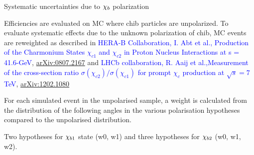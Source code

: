 \begin{frame}{Systematic uncertainties due to $\chi_{b}$ polarization}
\begin{block}{}
\small
Efficiencies are evaluated on MC where chib particles are unpolarized. To evaluate systematic effects due to the unknown polarization of chib, MC events are reweighted as described in \textcolor{blue}{HERA-B Collaboration, I. Abt et al.,  Production of the Charmonium States $\chi_{c1}$ and $\chi_{c2}$ in Proton Nucleus Interactions at s = 41.6-GeV}, \href{http://arxiv.org/abs/0807.2167}{arXiv:0807.2167} and
\textcolor{blue}{LHCb collaboration, R. Aaij et al.,Measurement of the cross-section ratio $\sigma(\chi_{c2})/\sigma(\chi_{c1})$ for prompt $\chi_c$
production at $\sqrt{s}=7$ TeV}, \href{http://arxiv.org/abs/1202.1080}{arXiv:1202.1080}
\end{block}
For each simulated event in the unpolarised sample, a weight is calculated from
the distribution of the following angles in the various polarisation hypotheses compared to the
unpolarised distribution.


\vspace{0.1in}

Two hypotheses for $\chi_{b 1}$ state (w0, w1) and three hypotheses for $\chi_{b 2}$ (w0, w1, w2).

\end{frame}